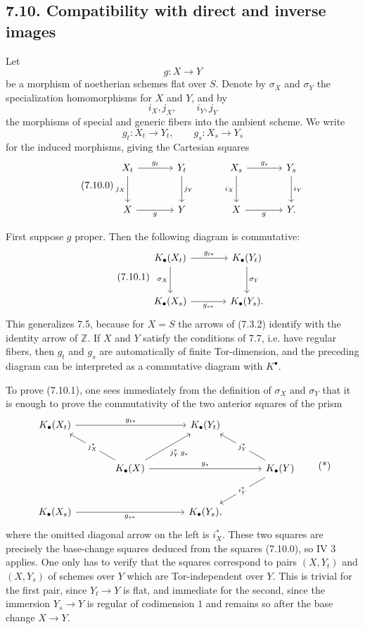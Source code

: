 \documentclass[11pt]{article}
\begin{document}
\subsection*{7.10. Compatibility with direct and inverse images}
Let
\[
  g:X\longrightarrow Y
\]
be a morphism of noetherian schemes flat over \(S\). Denote by \(\sigma_X\) and \(\sigma_Y\) the specialization homomorphisms for \(X\) and \(Y\), and by
\[
  i_X,j_X,\qquad i_Y,j_Y
\]
the morphisms of special and generic fibers into the ambient scheme. We write
\[
  g_t:X_t\to Y_t,\qquad g_s:X_s\to Y_s
\]
for the induced morphisms, giving the Cartesian squares
\begin{equation}\tag{7.10.0}
\begin{tikzcd}[column sep=large,row sep=large]
X_t \arrow[r,"g_t"] \arrow[d,"j_X"'] & Y_t \arrow[d,"j_Y"] &
X_s \arrow[r,"g_s"] \arrow[d,"i_X"'] & Y_s \arrow[d,"i_Y"]\\
X \arrow[r,"g"'] & Y &
X \arrow[r,"g"'] & Y .
\end{tikzcd}
\end{equation}

First suppose \(g\) proper. Then the following diagram is commutative:
\begin{equation}\tag{7.10.1}
\begin{tikzcd}[column sep=large,row sep=large]
K_\bullet(X_t) \arrow[r,"g_{t*}"] \arrow[d,"\sigma_X"'] &
K_\bullet(Y_t) \arrow[d,"\sigma_Y"]\\
K_\bullet(X_s) \arrow[r,"g_{s*}"'] &
K_\bullet(Y_s).
\end{tikzcd}
\end{equation}
This generalizes 7.5, because for \(X=S\) the arrows of (7.3.2) identify with the identity arrow of \(\mathbb Z\). If \(X\) and \(Y\) satisfy the conditions of 7.7, i.e. have regular fibers, then \(g_t\) and \(g_s\) are automatically of finite Tor-dimension, and the preceding diagram can be interpreted as a commutative diagram with \(K^\bullet\).

To prove (7.10.1), one sees immediately from the definition of \(\sigma_X\) and \(\sigma_Y\) that it is enough to prove the commutativity of the two anterior squares of the prism
\[
\begin{tikzcd}[column sep=large,row sep=large]
K_\bullet(X_t) \arrow[rr,"g_{t*}"] && K_\bullet(Y_t)\\
& K_\bullet(X) \arrow[ur,"j_Y^*\,g_*"'] \arrow[ul,"j_X^*" description] \arrow[rr,"g_*"] &&
K_\bullet(Y) \arrow[ul,"j_Y^*" description] \arrow[dl,"i_Y^*" description]\\
K_\bullet(X_s) \arrow[rr,"g_{s*}"'] && K_\bullet(Y_s),
\end{tikzcd}
\tag{*}
\]
where the omitted diagonal arrow on the left is \(i_X^*\). These two squares are precisely the base-change squares deduced from the squares (7.10.0), so IV 3 applies. One only has to verify that the squares correspond to pairs \((X,Y_t)\) and \((X,Y_s)\) of schemes over \(Y\) which are Tor-independent over \(Y\). This is trivial for the first pair, since \(Y_t\to Y\) is flat, and immediate for the second, since the immersion \(Y_s\to Y\) is regular of codimension \(1\) and remains so after the base change \(X\to Y\).
\end{document}
